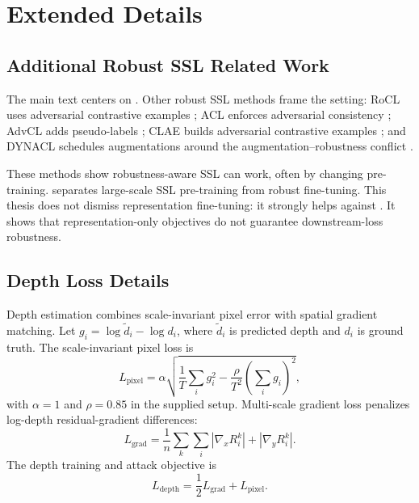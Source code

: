 \chapter{Extended Details}
\label{chap:extended-details}

\section{Additional Robust SSL Related Work}
\label{sec:robust-ssl-additional}

The main text centers on \DeACL. Other robust SSL methods frame the setting: RoCL uses adversarial contrastive examples \parencite{kim2020adversarial}; ACL enforces adversarial consistency \parencite{jiang2020robust}; AdvCL adds pseudo-labels \parencite{fan2021does}; CLAE builds adversarial contrastive examples \parencite{ho2020CLAE}; and DYNACL schedules augmentations around the augmentation--robustness conflict \parencite{luo2023rethinking}.

These methods show robustness-aware SSL can work, often by changing pre-training. \DeACL separates large-scale SSL pre-training from robust fine-tuning. This thesis does not dismiss representation fine-tuning: it strongly helps against \EmbedAttack. It shows that representation-only objectives do not guarantee downstream-loss robustness.

\section{Depth Loss Details}
\label{sec:depth-loss-details}

Depth estimation combines scale-invariant pixel error with spatial gradient matching. Let $g_i=\log \tilde{d}_i-\log d_i$, where $\tilde{d}_i$ is predicted depth and $d_i$ is ground truth. The scale-invariant pixel loss is
\begin{equation}
    L_{\mathrm{pixel}}
    =
    \alpha
    \sqrt{
        \frac{1}{T}\sum_i g_i^2
        -
        \frac{\rho}{T^2}\left(\sum_i g_i\right)^2
    },
\end{equation}
with $\alpha=1$ and $\rho=0.85$ in the supplied setup. Multi-scale gradient loss penalizes log-depth residual-gradient differences:
\begin{equation}
    L_{\mathrm{grad}}=
    \frac{1}{n}\sum_k\sum_i
    \left|\nabla_x R_i^k\right|+
    \left|\nabla_y R_i^k\right|.
\end{equation}
The depth training and attack objective is
\begin{equation}
    L_{\mathrm{depth}}=\frac{1}{2}L_{\mathrm{grad}}+L_{\mathrm{pixel}}.
\end{equation}

